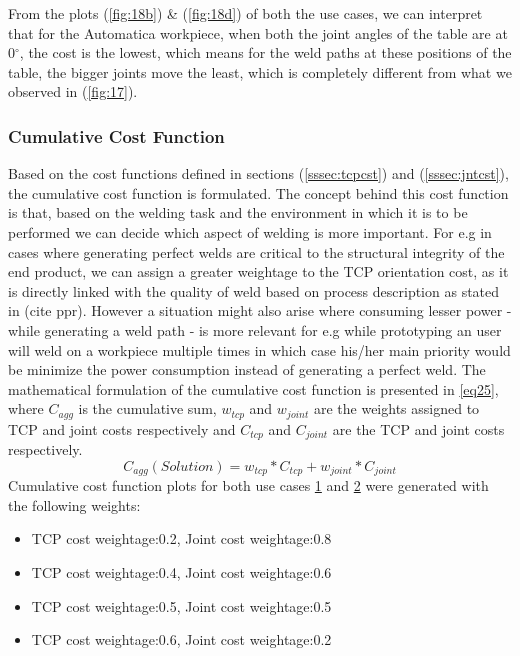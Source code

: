 From the plots (\ref{fig:18b}) \& (\ref{fig:18d}) of both the use cases, we can interpret that for the Automatica workpiece, when both the joint angles of the table are at 0$^{\circ}$, the cost is the lowest, which means for the weld paths at these positions of the table, the bigger joints move the least, which is completely different from what we observed in (\ref{fig:17}). 

\subsubsection{Cumulative Cost Function}
\label{sssec:aggcst}
Based on the cost functions defined in sections (\ref{sssec:tcpcst}) and (\ref{sssec:jntcst}), the cumulative cost function is formulated. The concept behind this cost function is that, based on the welding task and the environment in which it is to be performed we can decide which aspect of welding is more important. For e.g in cases where generating perfect welds are critical to the structural integrity of the end product, we can assign a greater weightage to the TCP orientation cost, as it is directly linked with the quality of weld based on process description as stated in (cite ppr). However a situation might also arise where consuming lesser power - while generating a weld path - is more relevant for e.g while prototyping an user will weld on a workpiece multiple times in which case his/her main priority would be minimize the power consumption instead of generating a perfect weld. The mathematical formulation of the cumulative cost function is presented in \ref{eq25}, where $C_{agg}$ is the cumulative sum, $w_{tcp}$ and $w_{joint}$ are the weights assigned to TCP and joint costs respectively and $C_{tcp}$ and $C_{joint}$ are the TCP and joint costs respectively. 
\begin{equation}
\label{eq25}
C_{agg}(\textit{Solution}) = w_{tcp}* C_{tcp} +  w_{joint}*C_{joint}
\end{equation}
Cumulative cost function plots for both use cases \hyperref[fig:uc1]{1} and \hyperref[fig:uc2]{2} were generated with the following weights: 
\begin{itemize}
\item TCP cost weightage:0.2, Joint cost weightage:0.8 
\item TCP cost weightage:0.4, Joint cost weightage:0.6
\item TCP cost weightage:0.5, Joint cost weightage:0.5
\item TCP cost weightage:0.6, Joint cost weightage:0.2
\end{itemize}

